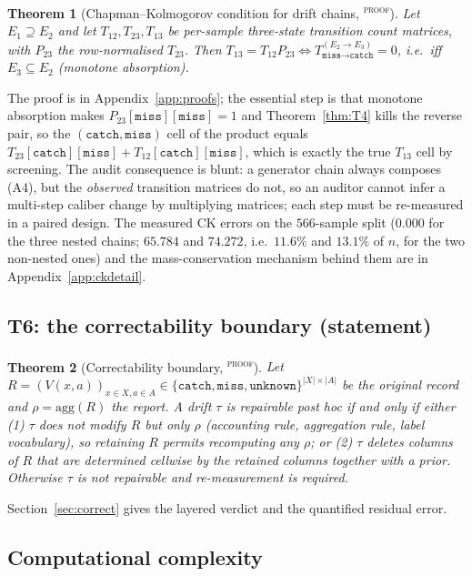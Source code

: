\documentclass{article}
\newtheorem{theorem}{Theorem}
\newcommand{\catch}{\texttt{catch}}
\newcommand{\miss}{\texttt{miss}}
\newcommand{\unk}{\texttt{unknown}}
\newcommand{\evtag}[1]{\textsuperscript{\textsc{#1}}}
\begin{document}
\begin{theorem}[Chapman--Kolmogorov condition for drift chains, \evtag{proof}]
\label{thm:T5}
Let $E_1\supseteq E_2$ and let $T_{12},T_{23},T_{13}$ be per-sample three-state transition count matrices,
with $P_{23}$ the row-normalised $T_{23}$. Then
$T_{13}=T_{12}P_{23}\Longleftrightarrow T^{(E_2\to E_3)}_{\miss\to\catch}=0$, i.e.\ iff
$E_3\subseteq E_2$ (monotone absorption).
\end{theorem}

The proof is in Appendix~\ref{app:proofs}; the essential step is that monotone absorption makes
$P_{23}[\miss][\miss]=1$ and Theorem~\ref{thm:T4} kills the reverse pair, so the $(\catch,\miss)$ cell of
the product equals $T_{23}[\catch][\miss]+T_{12}[\catch][\miss]$, which is exactly the true $T_{13}$ cell by
screening. The audit consequence is blunt: a generator chain always composes (A4), but the \emph{observed}
transition matrices do not, so an auditor cannot infer a multi-step caliber change by multiplying matrices;
each step must be re-measured in a paired design. The measured CK errors on the $566$-sample split
($0.000$ for the three nested chains; $65.784$ and $74.272$, i.e.\ $11.6\%$ and $13.1\%$ of $n$, for the two
non-nested ones) and the mass-conservation mechanism behind them are in
Appendix~\ref{app:ckdetail}.

\subsection{T6: the correctability boundary (statement)}
\label{sec:T6statement}

\begin{theorem}[Correctability boundary, \evtag{proof}]
\label{thm:T6}
Let $R=(V(x,a))_{x\in X,a\in A}\in\{\catch,\miss,\unk\}^{|X|\times|A|}$ be the original record and
$\rho=\mathrm{agg}(R)$ the report. A drift $\tau$ is repairable post hoc \emph{if and only if} either (1)
$\tau$ does not modify $R$ but only $\rho$ (accounting rule, aggregation rule, label vocabulary), so
retaining $R$ permits recomputing any $\rho$; or (2) $\tau$ deletes columns of $R$ that are determined
cellwise by the retained columns together with a prior. Otherwise $\tau$ is not repairable and re-measurement
is required.
\end{theorem}

Section~\ref{sec:correct} gives the layered verdict and the quantified residual error.

\subsection{Computational complexity}
\label{sec:complexity}
\end{document}
